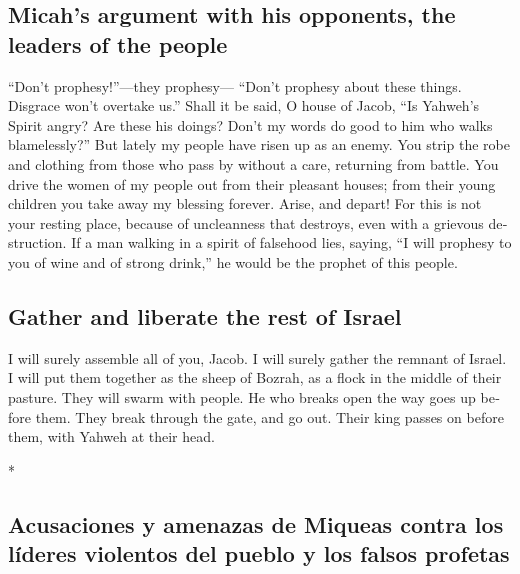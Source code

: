\begin{paracol}{2}
\begin{otherlanguage}{english}
\hypertarget{micahs-argument-with-his-opponents-the-leaders-of-the-people}{%
\subsection{Micah's argument with his opponents, the leaders of the
people}\label{micahs-argument-with-his-opponents-the-leaders-of-the-people}}

 ``Don't prophesy!''---they prophesy--- ``Don't prophesy
about these things. Disgrace won't overtake us.''  Shall
it be said, O house of Jacob, ``Is Yahweh's Spirit angry? Are these his
doings? Don't my words do good to him who walks blamelessly?''
 But lately my people have risen up as an enemy. You strip
the robe and clothing from those who pass by without a care, returning
from battle.  You drive the women of my people out from
their pleasant houses; from their young children you take away my
blessing forever.  Arise, and depart! For this is not
your resting place, because of uncleanness that destroys, even with a
grievous destruction.  If a man walking in a spirit of
falsehood lies, saying, ``I will prophesy to you of wine and of strong
drink,'' he would be the prophet of this people.

\hypertarget{gather-and-liberate-the-rest-of-israel}{%
\subsection{Gather and liberate the rest of
Israel}\label{gather-and-liberate-the-rest-of-israel}}

 I will surely assemble all of you, Jacob. I will surely
gather the remnant of Israel. I will put them together as the sheep of
Bozrah, as a flock in the middle of their pasture. They will swarm with
people.  He who breaks open the way goes up before them.
They break through the gate, and go out. Their king passes on before
them, with Yahweh at their head.

\end{otherlanguage}

\switchcolumn[0]*

\hypertarget{acusaciones-y-amenazas-de-miqueas-contra-los-luxedderes-violentos-del-pueblo-y-los-falsos-profetas}{%
\subsection{Acusaciones y amenazas de Miqueas contra los líderes
violentos del pueblo y los falsos
profetas}\label{acusaciones-y-amenazas-de-miqueas-contra-los-luxedderes-violentos-del-pueblo-y-los-falsos-profetas}}


\end{paracol}
